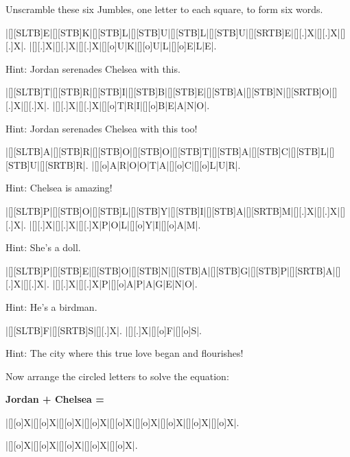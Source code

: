 Unscramble these six Jumbles, one letter to each square, to form six words.\\

\begin{Puzzle}{10}{2}
|[][SLTB]E|[][STB]K|[][STB]L|[][STB]U|[][STB]L|[][STB]U|[][SRTB]E|[][.]X|[][.]X|[][.]X|.
|[][.]X|[][.]X|[][.]X|[][o]U|K|[][o]U|L|[][o]E|L|E|.
\end{Puzzle}
Hint: Jordan serenades Chelsea with this.\bigskip

\begin{Puzzle}{10}{2}
|[][SLTB]T|[][STB]R|[][STB]I|[][STB]B|[][STB]E|[][STB]A|[][STB]N|[][SRTB]O|[][.]X|[][.]X|.
|[][.]X|[][.]X|[][o]T|R|I|[][o]B|E|A|N|O|.
\end{Puzzle}
Hint: Jordan serenades Chelsea with this too!\bigskip

\begin{Puzzle}{10}{2}
|[][SLTB]A|[][STB]R|[][STB]O|[][STB]O|[][STB]T|[][STB]A|[][STB]C|[][STB]L|[][STB]U|[][SRTB]R|.
|[][o]A|R|O|O|T|A|[][o]C|[][o]L|U|R|.
\end{Puzzle}
Hint: Chelsea is amazing!\bigskip

\begin{Puzzle}{10}{2}
|[][SLTB]P|[][STB]O|[][STB]L|[][STB]Y|[][STB]I|[][STB]A|[][SRTB]M|[][.]X|[][.]X|[][.]X|.
|[][.]X|[][.]X|[][.]X|P|O|L|[][o]Y|I|[][o]A|M|.
\end{Puzzle}
Hint: She's a doll.\bigskip

\begin{Puzzle}{10}{2}
|[][SLTB]P|[][STB]E|[][STB]O|[][STB]N|[][STB]A|[][STB]G|[][STB]P|[][SRTB]A|[][.]X|[][.]X|.
|[][.]X|[][.]X|P|[][o]A|P|A|G|E|N|O|.
\end{Puzzle}
Hint: He's a birdman.\bigskip

\begin{Puzzle}{10}{2}
|[][SLTB]F|[][SRTB]S|[][.]X|.
|[][.]X|[][o]F|[][o]S|.
\end{Puzzle}
Hint: The city where this true love began and flourishes!\bigskip

Now arrange the circled letters to solve the equation:\bigskip

{\bf Jordan + Chelsea =}\bigskip

\begin{Puzzle}{10}{1}
|[][o]X|[][o]X|[][o]X|[][o]X|[][o]X|[][o]X|[][o]X|[][o]X|[][o]X|.
\end{Puzzle}

\begin{Puzzle}{10}{1}
|[][o]X|[][o]X|[][o]X|[][o]X|[][o]X|.
\end{Puzzle}

